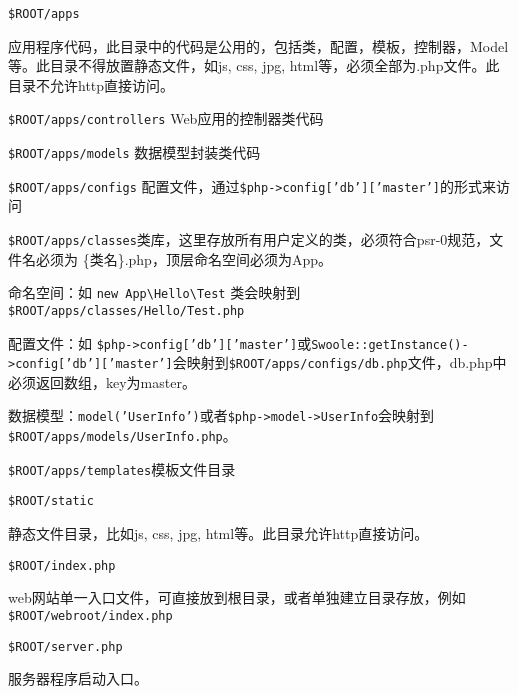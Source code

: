 \begin{compactenum}
\item \texttt{\$ROOT/apps}

应用程序代码，此目录中的代码是公用的，包括类，配置，模板，控制器，Model等。此目录不得放置静态文件，如js, css, jpg, html等，必须全部为.php文件。此目录不允许http直接访问。

\begin{compactenum}
\item \texttt{\$ROOT/apps/controllers} Web应用的控制器类代码



\item \texttt{\$ROOT/apps/models} 数据模型封装类代码
\item \texttt{\$ROOT/apps/configs} 配置文件，通过\texttt{\$php->config['db']['master']}的形式来访问
\item \texttt{\$ROOT/apps/classes}类库，这里存放所有用户定义的类，必须符合psr-0规范，文件名必须为 \{类名\}.php，顶层命名空间必须为App。

命名空间：如 \texttt{new App\textbackslash Hello\textbackslash Test} 类会映射到 \texttt{\$ROOT/apps/classes/Hello/Test.php}

配置文件：如 \texttt{\$php->config['db']['master']}或\texttt{Swoole::getInstance()->config['db']['master']}会映射到\texttt{\$ROOT/apps/configs/db.php}文件，db.php中必须返回数组，key为master。

数据模型：\texttt{model('UserInfo')}或者\texttt{\$php->model->UserInfo}会映射到\texttt{\$ROOT/apps/models/UserInfo.php}。


\item \texttt{\$ROOT/apps/templates}模板文件目录
\end{compactenum}



\item \texttt{\$ROOT/static}

静态文件目录，比如js, css, jpg, html等。此目录允许http直接访问。

\item \texttt{\$ROOT/index.php}

web网站单一入口文件，可直接放到根目录，或者单独建立目录存放，例如\texttt{\$ROOT/webroot/index.php}

\item \texttt{\$ROOT/server.php}

服务器程序启动入口。

\end{compactenum}

